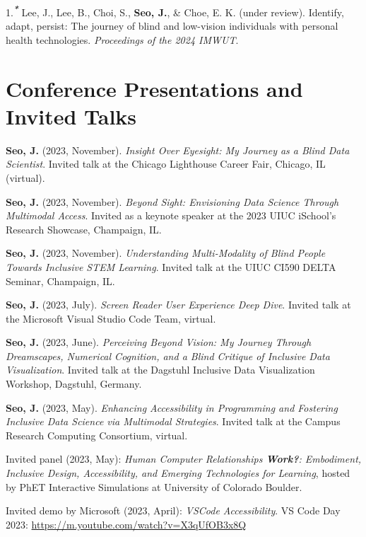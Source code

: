 \documentclass[11pt,a4paper,]{awesome-cv}
\newlength{\cslhangindent}
\newenvironment{CSLReferences}[2] %
 {\begin{list}{}{%
  \setlength{\itemindent}{0pt}
  \setlength{\leftmargin}{0pt}
  \setlength{\parsep}{0pt}
  \ifodd #1
   \setlength{\leftmargin}{\cslhangindent}
   \setlength{\itemindent}{-1\cslhangindent}
  \fi
  \setlength{\itemsep}{#2\baselineskip}}}
 {\end{list}}
\begin{document}
\label{refs-d23428c868f73b87bd0f2f5ed4acdc1e}
\begin{CSLReferences}{1}{0}
1.\textsuperscript{\textbf{\emph{*}}} Lee, J., Lee, B., Choi, S.,
\textbf{Seo, J.}, \& Choe, E. K. (under review). Identify, adapt,
persist: The journey of blind and low-vision individuals with personal
health technologies. \emph{Proceedings of the 2024 IMWUT}.

\end{CSLReferences}

\section{Conference Presentations and Invited
Talks}\label{conference-presentations-and-invited-talks}

\textbf{Seo, J.} (2023, November). \emph{Insight Over Eyesight: My
Journey as a Blind Data Scientist}. Invited talk at the Chicago
Lighthouse Career Fair, Chicago, IL (virtual).

\textbf{Seo, J.} (2023, November). \emph{Beyond Sight: Envisioning Data
Science Through Multimodal Access}. Invited as a keynote speaker at the
2023 UIUC iSchool's Research Showcase, Champaign, IL.

\textbf{Seo, J.} (2023, November). \emph{Understanding Multi-Modality of
Blind People Towards Inclusive STEM Learning}. Invited talk at the UIUC
CI590 DELTA Seminar, Champaign, IL.

\textbf{Seo, J.} (2023, July). \emph{Screen Reader User Experience Deep
Dive}. Invited talk at the Microsoft Visual Studio Code Team, virtual.

\textbf{Seo, J.} (2023, June). \emph{Perceiving Beyond Vision: My
Journey Through Dreamscapes, Numerical Cognition, and a Blind Critique
of Inclusive Data Visualization}. Invited talk at the Dagstuhl Inclusive
Data Visualization Workshop, Dagstuhl, Germany.

\textbf{Seo, J.} (2023, May). \emph{Enhancing Accessibility in
Programming and Fostering Inclusive Data Science via Multimodal
Strategies}. Invited talk at the Campus Research Computing Consortium,
virtual.

Invited panel (2023, May): \emph{Human Computer Relationships
\textbf{Work?}: Embodiment, Inclusive Design, Accessibility, and
Emerging Technologies for Learning}, hosted by PhET Interactive
Simulations at University of Colorado Boulder.

Invited demo by Microsoft (2023, April): \emph{VSCode Accessibility}. VS
Code Day 2023: \url{https://m.youtube.com/watch?v=X3qUfOB3x8Q}
\end{document}
